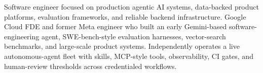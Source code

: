 


Software engineer focused on production agentic AI systems, data-backed product platforms, evaluation frameworks, and reliable backend infrastructure. Google Cloud FDE and former Meta engineer who built an early Gemini-based software-engineering agent, SWE-bench-style evaluation harnesses, vector-search benchmarks, and large-scale product systems. Independently operates a live autonomous-agent fleet with skills, MCP-style tools, observability, CI gates, and human-review thresholds across credentialed workflows.







